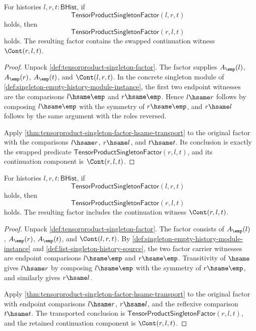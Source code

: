 \begin{theorem}
\label{thm:tensorproduct-singleton-factor-source-target-swap}
For histories $l,r,t:\mathsf{BHist}$, if
$$
\mathsf{TensorProductSingletonFactor}(l,r,t)
$$
holds, then
$$
\mathsf{TensorProductSingletonFactor}(r,l,t)
$$
holds. The resulting factor contains the swapped continuation witness
$\Cont(r,l,t)$.
\end{theorem}
\begin{proof}
Unpack \autoref{def:tensorproduct-singleton-factor}. The factor supplies
$A_{\emp}(l)$, $A_{\emp}(r)$, $A_{\emp}(t)$, and
$\Cont(l,r,t)$. In the concrete singleton module of
\autoref{def:singleton-empty-history-module-instance}, the first two endpoint
witnesses are the comparisons $l\hsame\emp$ and $r\hsame\emp$. Hence
$l\hsame r$ follows by composing $l\hsame\emp$ with the symmetry of
$r\hsame\emp$, and $r\hsame l$ follows by the same argument with the roles
reversed.

Apply \autoref{thm:tensorproduct-singleton-factor-hsame-transport} to the
original factor with the comparisons $l\hsame r$, $r\hsame l$, and
$t\hsame t$. Its conclusion is exactly the swapped predicate
$\mathsf{TensorProductSingletonFactor}(r,l,t)$, and its continuation component
is $\Cont(r,l,t)$.
\end{proof}

\begin{theorem}
\label{thm:tensorproduct-singleton-factor-swap-symmetry}
For histories $l,r,t:\mathsf{BHist}$, if
$$
\mathsf{TensorProductSingletonFactor}(l,r,t)
$$
holds, then
$$
\mathsf{TensorProductSingletonFactor}(r,l,t)
$$
holds. The resulting factor includes the continuation witness $\Cont(r,l,t)$.
\end{theorem}
\begin{proof}
Unpack \autoref{def:tensorproduct-singleton-factor}. The factor consists of
$A_{\emp}(l)$, $A_{\emp}(r)$, $A_{\emp}(t)$, and $\Cont(l,r,t)$. By
\autoref{def:singleton-empty-history-module-instance} and
\autoref{def:list-singleton-history-source}, the two factor carrier witnesses
are endpoint comparisons $l\hsame\emp$ and $r\hsame\emp$. Transitivity of
$\hsame$ gives $l\hsame r$ by composing $l\hsame\emp$ with the symmetry of
$r\hsame\emp$, and similarly gives $r\hsame l$.

Apply \autoref{thm:tensorproduct-singleton-factor-hsame-transport} to the
original factor with endpoint comparisons $l\hsame r$, $r\hsame l$, and the
reflexive comparison $t\hsame t$. The transported conclusion is
$\mathsf{TensorProductSingletonFactor}(r,l,t)$, and the retained continuation
component is $\Cont(r,l,t)$.
\end{proof}

